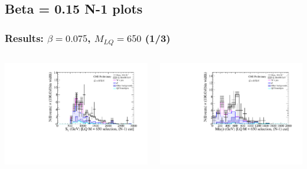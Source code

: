 \documentclass[bigger]{beamer}
\begin{document}
\subsection{Beta = 0.15 N-1 plots}
\label{sec-7-2}
\begin{frame}
\frametitle{Results: $\beta = 0.075$, $M_{LQ} = 650$ (1/3)}
\label{sec-7-2-1}
\begin{columns}
\begin{column}{0.6\textwidth}
\label{sec-7-2-1-1}

\centering
\ST
\includegraphics[width=\textwidth]{fig/enu/nMinus1/ST_mtAndMetAndMejLQ650_enujj.pdf}
\end{column}
\begin{column}{0.6\textwidth}
\label{sec-7-2-1-2}

\centering
\mej
\includegraphics[width=\textwidth]{fig/enu/nMinus1/Mej_stAndMtAndMetLQ650_enujj.pdf}
\end{column}
\end{columns}
\end{frame}
\end{document}
